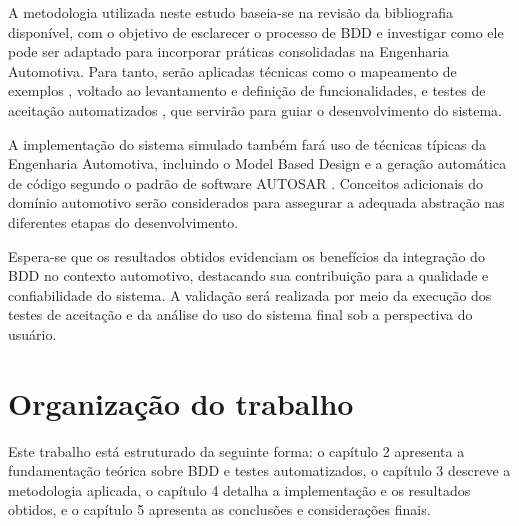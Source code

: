 A metodologia utilizada neste estudo baseia-se na revisão da bibliografia disponível, com o objetivo de esclarecer o processo de BDD e investigar como ele pode 
ser adaptado para incorporar práticas consolidadas na Engenharia Automotiva. Para tanto, serão aplicadas técnicas como o mapeamento de exemplos 
\cite{Lawrence2019cucumber, cucumberExampleMapping}
, voltado ao levantamento e definição de funcionalidades, e testes de aceitação automatizados 
\cite{studyBDD}
, que servirão para guiar o desenvolvimento do sistema.

A implementação do sistema simulado também fará uso de técnicas típicas da Engenharia Automotiva, incluindo o Model Based Design
\cite{Vincentelli2001, mathworksMBD2024} e a geração automática de código segundo o padrão de software AUTOSAR 
\cite{autosarClassic}. Conceitos adicionais do domínio automotivo serão considerados para 
assegurar a adequada abstração nas diferentes etapas do desenvolvimento.

Espera-se que os resultados obtidos evidenciam os benefícios da integração do BDD no contexto automotivo, destacando sua contribuição para a qualidade e 
confiabilidade do sistema. A validação será realizada por meio da execução dos testes de aceitação e da análise do uso do sistema final sob a perspectiva do usuário.

\section{Organização do trabalho}
Este trabalho está estruturado da seguinte forma: o capítulo 2 apresenta a fundamentação teórica sobre BDD e testes automatizados, 
o capítulo 3 descreve a metodologia aplicada, o capítulo 4 detalha a implementação e os resultados obtidos, e o capítulo 5 apresenta as conclusões e considerações finais.
